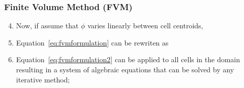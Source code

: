 \documentclass[10pt,compress]{beamer}
\begin{document}
\begin{frame}
 \frametitle{Finite Volume Method (FVM)} 

\begin{enumerate}
   \setcounter{enumi}{3}
     \item <1-> Now, if assume that $\phi$ varies linearly between cell centroids,
     \item <2-> Equation~\ref{eq:fvmformulation} can be rewriten as
     \item <3-> Equation~\ref{eq:fvmformulation2} can be applied to all cells in the domain resulting in a system of algebraic equations that can be solved by any iterative method;
      
\end{enumerate}  
 
\end{frame}
\end{document}
